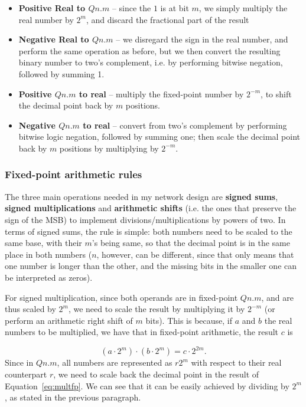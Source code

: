 \begin{itemize}
    \item \textbf{Positive Real to $Qn.m$} -- since the $1$ is at bit $m$, we simply multiply the real number by $2^m$, and discard the fractional part of the result
    \item \textbf{Negative Real to $Qn.m$} -- we disregard the sign in the real number, and perform the same operation as before, but we then convert the resulting binary number to two's complement, i.e. by performing bitwise negation, followed by summing 1.
    \item \textbf{Positive $Qn.m$ to real} -- multiply the fixed-point number by $2^{-m}$, to shift the decimal point back by $m$ positions. 
    \item \textbf{Negative $Qn.m$ to real} -- convert from two's complement by performing bitwise logic negation, followed by summing one; then scale the decimal point back by $m$ positions by multiplying by $2^{-m}$. 
\end{itemize}

\subsubsection{Fixed-point arithmetic rules}\label{sec:arithrulesfp}
The three main operations needed in my network design are \textbf{signed sums}, \textbf{signed multiplications} and \textbf{arithmetic shifts} (i.e. the ones that preserve the sign of the MSB) to implement divisions/multiplications by powers of two. In terms of signed sums, the rule is simple: both numbers need to be scaled to the same base, with their $m$'s being same, so that the decimal point is in the same place in both numbers ($n$, however, can be different, since that only means that one number is longer than the other, and the missing bits in the smaller one can be interpreted as zeros).

For signed multiplication, since both operands are in fixed-point $Qn.m$, and are thus scaled by $2^m$, we need to scale the result by multiplying it by $2^{-m}$ (or perform an arithmetic right shift of $m$ bits). This is because, if $a$ and $b$ the real numbers to be multiplied, we have that in fixed-point arithmetic, the result $c$ is

\begin{equation}\label{eq:multfp}
    (a\cdot2^m) \cdot (b\cdot2^m) = c \cdot 2^{2m}.
\end{equation}
Since in $Qn.m$, all numbers are represented as $r 2^{m}$ with respect to their real counterpart $r$, we need to scale back the decimal point in the result of Equation~\ref{eq:multfp}. We can see that it can be easily achieved by dividing by $2^m$, as stated in the previous paragraph.


